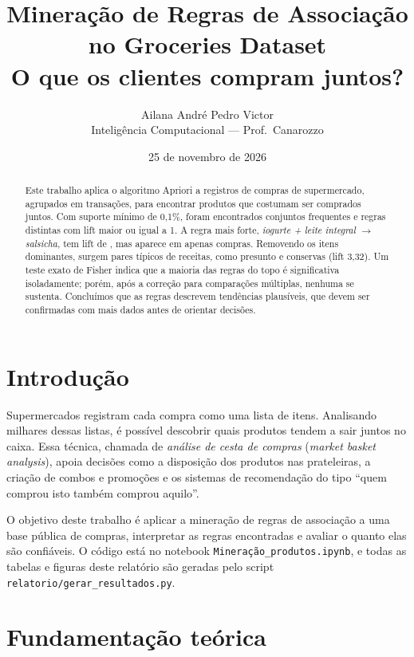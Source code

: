 \documentclass[11pt,a4paper]{article}
\title{\textbf{Mineração de Regras de Associação\\no Groceries Dataset}\\[6pt]
\large O que os clientes compram juntos?}
\author{Ailana \qquad André \qquad Pedro \qquad Victor\\[8pt]
\normalsize Inteligência Computacional --- Prof.\ Canarozzo}
\date{25 de novembro de 2026}
\begin{document}
\maketitle

\begin{abstract}
Este trabalho aplica o algoritmo Apriori a \NumLinhas{} registros de compras de supermercado, agrupados em \NumCompras{} transações, para encontrar produtos que costumam ser comprados juntos. Com suporte mínimo de 0,1\%, foram encontrados \NumFrequentesRUm{} conjuntos frequentes e \NumRegrasUnicasRUm{} regras distintas com lift maior ou igual a 1. A regra mais forte, \emph{iogurte + leite integral $\rightarrow$ salsicha}, tem lift de \MelhorLift{}, mas aparece em apenas \MelhorCompras{} compras. Removendo os itens dominantes, surgem pares típicos de receitas, como presunto e conservas (lift 3,32). Um teste exato de Fisher indica que a maioria das regras do topo é significativa isoladamente; porém, após a correção para comparações múltiplas, nenhuma se sustenta. Concluímos que as regras descrevem tendências plausíveis, que devem ser confirmadas com mais dados antes de orientar decisões.
\end{abstract}

\section{Introdução}

Supermercados registram cada compra como uma lista de itens. Analisando milhares dessas listas, é possível descobrir quais produtos tendem a sair juntos no caixa. Essa técnica, chamada de \emph{análise de cesta de compras} (\emph{market basket analysis}), apoia decisões como a disposição dos produtos nas prateleiras, a criação de combos e promoções e os sistemas de recomendação do tipo ``quem comprou isto também comprou aquilo''.

O objetivo deste trabalho é aplicar a mineração de regras de associação a uma base pública de compras, interpretar as regras encontradas e avaliar o quanto elas são confiáveis. O código está no notebook \texttt{Mineração\_produtos.ipynb}, e todas as tabelas e figuras deste relatório são geradas pelo script \texttt{relatorio/gerar\_resultados.py}.

\section{Fundamentação teórica}
\end{document}
